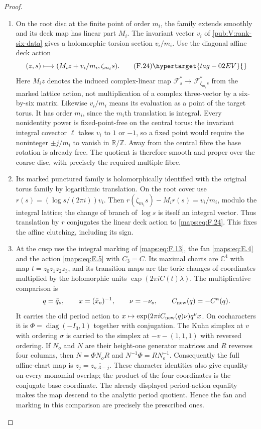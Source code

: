 \begin{proof}
\begin{enumerate}[label={$\langle1\rangle$\arabic*.}]
\item On the root disc at the finite point of order $m_i$, the family
extends smoothly and its deck map has linear part $M_i$.
The invariant vector $v_i$ of \cref{pub:V:rank-six-data} gives a holomorphic
torsion section $v_i/m_i$.  Use the diagonal affine deck action
\[
 (z,s)\longmapsto(M_i z+v_i/m_i,\zeta_{m_i}s).
 \tag{F.24}\hypertarget{tag-02EV}{}\label{maps:eq:F.24}
\]
Here $M_i z$ denotes the induced complex-linear map
$\mathcal F_s^*\to\mathcal F_{\zeta_{m_i}s}^*$ from the marked
lattice action, not multiplication of a complex three-vector
by a six-by-six matrix.  Likewise $v_i/m_i$ means its evaluation
as a point of the target torus.
It has order $m_i$, since the $m_i$th translation is integral.
Every nonidentity power is fixed-point-free on the central
torus: the invariant integral covector $\ell$ takes $v_i$ to
$1$ or $-1$, so a fixed point would require the noninteger
$\pm j/m_i$ to vanish in $\mathbb R/\mathbb Z$.
Away from the central fibre the base rotation is already free.
The quotient is therefore smooth and proper over the coarse
disc, with precisely the required multiple fibre.

\item Its marked punctured family is holomorphically identified with
the original torus family by logarithmic translation.  On the
root cover use $r(s)=(\log s/(2\pi i))v_i$.  Then
$r(\zeta_{m_i}s)-M_i r(s)=v_i/m_i$, modulo the integral lattice;
the change of branch of $\log s$ is itself an integral vector.
Thus translation by $r$ conjugates the linear deck action to
\eqref{maps:eq:F.24}.  This fixes the affine clutching, including its sign.

\item At the cusp use the integral marking of \eqref{maps:eq:F.13}, the fan \eqref{maps:eq:E.4}
and the action \eqref{maps:eq:E.5} with $C_3=C$.
Its maximal charts are $\mathbb C^4$ with map
$t=z_0z_1z_2z_3$, and its transition maps are the toric changes
of coordinates multiplied by the holomorphic units
$\exp(2\pi i C(t)\lambda)$.
The multiplicative comparison is
\[
 q=\bar q_o,\qquad x=(\bar x_o)^{-1},\qquad
 \nu=-\nu_o,
 \qquad C_{\rm new}(q)=-C^\kappa(q).
\]
It carries the old period action to
$x\mapsto\exp(2\pi iC_{\rm new}(q)\nu)q^\nu x$.
On cocharacters it is
$\Phi=\operatorname{diag}(-I_3,1)$ together with conjugation.
The Kuhn simplex at $v$ with ordering $\sigma$ is carried to
the simplex at $-v-(1,1,1)$ with reversed ordering.
If $N_o$ and $N$ are their height-one generator matrices and
$R$ reverses four columns, then
$N=\Phi N_oR$ and $N^{-1}\Phi=RN_o^{-1}$.
Consequently the full affine-chart map is
$z_j=\overline{z_{o,3-j}}$.  These character identities also
give equality on every monomial overlap; the product of the
four coordinates is the conjugate base coordinate.
The already displayed period-action equality makes the map
descend to the analytic period quotient.  Hence the fan and
marking in this comparison are precisely the prescribed ones.


\end{enumerate}
\end{proof}
